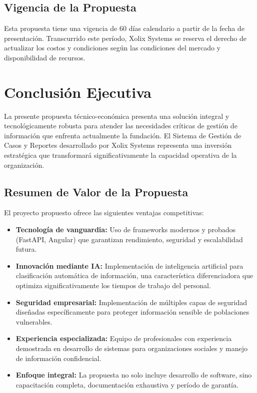 \documentclass[12pt,letterpaper]{article}
\begin{document}
\subsection{Vigencia de la Propuesta}

Esta propuesta tiene una vigencia de 60 días calendario a partir de la fecha de presentación. Transcurrido este período, Xolix Systems se reserva el derecho de actualizar los costos y condiciones según las condiciones del mercado y disponibilidad de recursos.

\newpage



\section{Conclusión Ejecutiva}

La presente propuesta técnico-económica presenta una solución integral y tecnológicamente robusta para atender las necesidades críticas de gestión de información que enfrenta actualmente la fundación. El Sistema de Gestión de Casos y Reportes desarrollado por Xolix Systems representa una inversión estratégica que transformará significativamente la capacidad operativa de la organización.

\subsection{Resumen de Valor de la Propuesta}

El proyecto propuesto ofrece las siguientes ventajas competitivas:

\begin{itemize}
    \item \textbf{Tecnología de vanguardia:} Uso de frameworks modernos y probados (FastAPI, Angular) que garantizan rendimiento, seguridad y escalabilidad futura.
    
    \item \textbf{Innovación mediante IA:} Implementación de inteligencia artificial para clasificación automática de información, una característica diferenciadora que optimiza significativamente los tiempos de trabajo del personal.
    
    \item \textbf{Seguridad empresarial:} Implementación de múltiples capas de seguridad diseñadas específicamente para proteger información sensible de poblaciones vulnerables.
    
    \item \textbf{Experiencia especializada:} Equipo de profesionales con experiencia demostrada en desarrollo de sistemas para organizaciones sociales y manejo de información confidencial.
    
    \item \textbf{Enfoque integral:} La propuesta no solo incluye desarrollo de software, sino capacitación completa, documentación exhaustiva y período de garantía.
\end{itemize}
\end{document}
